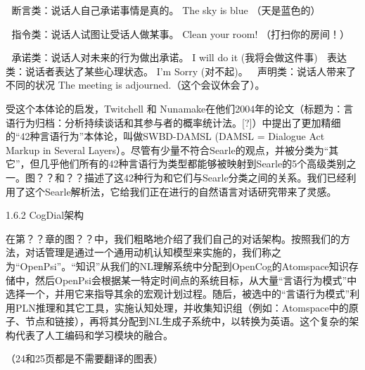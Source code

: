 	断言类：说话人自己承诺事情是真的。
The sky is blue （天是蓝色的）

	指令类：说话人试图让受话人做某事。
Clean your room! （打扫你的房间！）


	承诺类：说话人对未来的行为做出承诺。
I will do it (我将会做这件事)
	表达类：说话者表达了某些心理状态。
I’m Sorry (对不起)。
	声明类：说话人带来了不同的状况
The meeting is adjourned.（这个会议休会了）。

受这个本体论的启发，Twitchell 和 Nunamake在他们2004年的论文（标题为：言语行为归档：分析持续谈话和其参与者的概率统计法。[?]）中提出了更加精细的“42种言语行为”本体论，叫做SWBD-DAMSL (DAMSL = Dialogue Act Markup in Several Layers）。尽管有少量不符合Searle的观点，并被分类为“其它”，但几乎他们所有的42种言语行为类型都能够被映射到Searle的5个高级类别之一。图？？和？？描述了这42种行为和它们与Searle分类之间的关系。我们已经利用了这个Searle解析法，它给我们正在进行的自然语言对话研究带来了灵感。

1.6.2 CogDial架构

在第？？章的图？？中，我们粗略地介绍了我们自己的对话架构。按照我们的方法，对话管理是通过一个通用动机认知模型来实施的，我们称之为“OpenPsi”。“知识”从我们的NL理解系统中分配到OpenCog的Atomspace知识存储中，然后OpenPsi会根据某一特定时间点的系统目标，从大量“言语行为模式”中选择一个，并用它来指导其余的宏观计划过程。随后，被选中的“言语行为模式”利用PLN推理和其它工具，实施认知处理，并收集知识组（例如：Atomspace中的原子、节点和链接），再将其分配到NL生成子系统中，以转换为英语。这个复杂的架构代表了人工编码和学习模块的融合。
 
（24和25页都是不需要翻译的图表）
